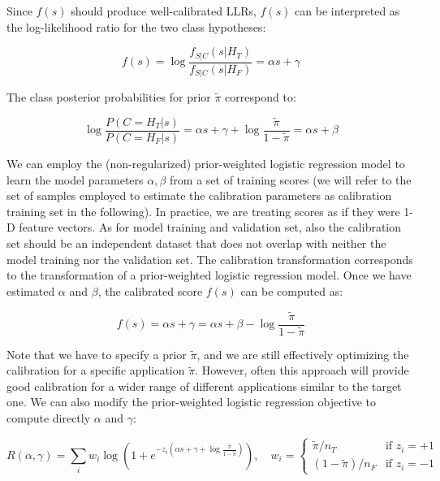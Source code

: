 Since $f(s)$ should produce well-calibrated LLRs, $f(s)$ can be interpreted as the log-likelihood ratio for the two class hypotheses:

\begin{equation*}
f(s) = \log \frac{f_{S|C}(s|H_T)}{f_{S|C}(s|H_F)} = \alpha s + \gamma
\end{equation*}

The class posterior probabilities for prior $\tilde{\pi}$ correspond to:

\begin{equation*}
\log \frac{P(C=H_T|s)}{P(C=H_F|s)} = \alpha s + \gamma + \log \frac{\tilde{\pi}}{1-\tilde{\pi}} = \alpha s + \beta
\end{equation*}

We can employ the (non-regularized) prior-weighted logistic regression model to learn the model parameters $\alpha, \beta$ from a set of training scores (we will refer to the set of samples employed to estimate the calibration parameters as calibration training set in the following). In practice, we are treating scores as if they were 1-D feature vectors. As for model training and validation set, also the calibration set should be an independent dataset that does not overlap with neither the model training nor the validation set. The calibration transformation corresponds to the transformation of a prior-weighted logistic regression model. Once we have estimated $\alpha$ and $\beta$, the calibrated score $f(s)$ can be computed as:

\begin{equation*}
f(s) = \alpha s + \gamma = \alpha s + \beta - \log \frac{\tilde{\pi}}{1-\tilde{\pi}}
\end{equation*}

Note that we have to specify a prior $\tilde{\pi}$, and we are still effectively optimizing the calibration for a specific application $\tilde{\pi}$. However, often this approach will provide good calibration for a wider range of different applications similar to the target one. We can also modify the prior-weighted logistic regression objective to compute directly $\alpha$ and $\gamma$:

\begin{equation*}
R(\alpha,\gamma) = \sum_i w_i \log \left(1 + e^{-z_i (\alpha s + \gamma + \log \frac{\tilde{\pi}}{1-\tilde{\pi}})}\right), \quad w_i = \begin{cases} \tilde{\pi}/n_T & \text{if } z_i = +1 \\ (1-\tilde{\pi})/n_F & \text{if } z_i = -1 \end{cases}
\end{equation*}

